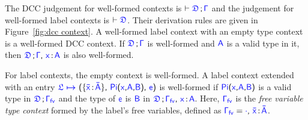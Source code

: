 The DCC judgement for well-formed contexts is $\vdash \targetcon$ and the judgement for well-formed label contexts is $\vdash \target{\fdef}$. Their derivation rules are given in Figure~\ref{fig:dcc context}. A well-formed label context with an empty type context is a well-formed DCC context. 
If $\targetcon$ is well-formed and $\target{A}$ is a valid type in it, then $\target{\fdef} \semicolon \target{\Gamma} \sfcomma \itemtype{x}{A}$ is also well-formed. 

For label contexts, the empty context is well-formed. A label context extended with an entry $\itemdef{\target{\flabel}}{\itemtype{\bar{x}}{\bar{A}}}{\targetpi{x}{A}{B}}{\target{e}}$ is well-formed if $\targetpi{x}{A}{B}$ is a valid type in $\target{\fdef} \semicolon \target{\Gamma_{fv}}$ and the type of $\target{e}$ is $\target{B}$ in $\target{\fdef} \semicolon \target{\Gamma_{fv}} \sfcomma \itemtype{x}{A}$. Here, $\target{\Gamma_{fv}}$ is the \textit{free variable type context} formed by the label's free variables, defined as $\target{\Gamma_{fv}} = \target{\cdot} \sfcomma \itemtype{\bar{x}}{\bar{A}}$.

